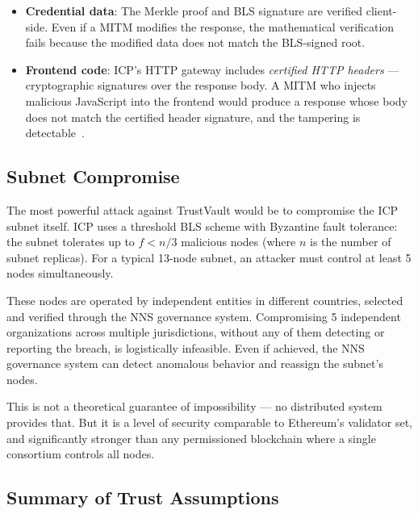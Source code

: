 \documentclass[journal]{IEEEtran}
\begin{document}
\begin{itemize}[leftmargin=*]
  \item \textbf{Credential data}: The Merkle proof and BLS signature are verified client-side. Even if a MITM modifies the response, the mathematical verification fails because the modified data does not match the BLS-signed root.
  \item \textbf{Frontend code}: ICP's HTTP gateway includes \emph{certified HTTP headers} — cryptographic signatures over the response body. A MITM who injects malicious JavaScript into the frontend would produce a response whose body does not match the certified header signature, and the tampering is detectable~\cite{dfinity2023httpgateway}.
\end{itemize}

\subsection{Subnet Compromise}

The most powerful attack against TrustVault would be to compromise the ICP subnet itself. ICP uses a threshold BLS scheme with Byzantine fault tolerance: the subnet tolerates up to $f < n/3$ malicious nodes (where $n$ is the number of subnet replicas). For a typical 13-node subnet, an attacker must control at least 5 nodes simultaneously.

These nodes are operated by independent entities in different countries, selected and verified through the NNS governance system. Compromising 5 independent organizations across multiple jurisdictions, without any of them detecting or reporting the breach, is logistically infeasible. Even if achieved, the NNS governance system can detect anomalous behavior and reassign the subnet's nodes.

This is not a theoretical guarantee of impossibility — no distributed system provides that. But it is a level of security comparable to Ethereum's validator set, and significantly stronger than any permissioned blockchain where a single consortium controls all nodes.

\subsection{Summary of Trust Assumptions}
\end{document}
